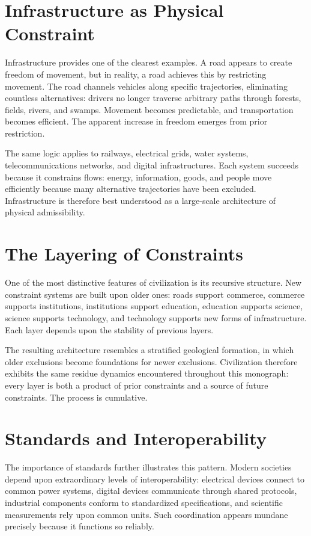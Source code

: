 \documentclass[11pt,oneside]{book}
\theoremstyle{plain}
\theoremstyle{definition}
\theoremstyle{remark}
\begin{document}
\section{Infrastructure as Physical Constraint}

Infrastructure provides one of the clearest examples. A road appears to create freedom of movement, but in reality, a road achieves this by restricting movement. The road channels vehicles along specific trajectories, eliminating countless alternatives: drivers no longer traverse arbitrary paths through forests, fields, rivers, and swamps. Movement becomes predictable, and transportation becomes efficient. The apparent increase in freedom emerges from prior restriction.

The same logic applies to railways, electrical grids, water systems, telecommunications networks, and digital infrastructures. Each system succeeds because it constrains flows: energy, information, goods, and people move efficiently because many alternative trajectories have been excluded. Infrastructure is therefore best understood as a large-scale architecture of physical admissibility.

\section{The Layering of Constraints}

One of the most distinctive features of civilization is its recursive structure. New constraint systems are built upon older ones: roads support commerce, commerce supports institutions, institutions support education, education supports science, science supports technology, and technology supports new forms of infrastructure. Each layer depends upon the stability of previous layers.

The resulting architecture resembles a stratified geological formation, in which older exclusions become foundations for newer exclusions. Civilization therefore exhibits the same residue dynamics encountered throughout this monograph: every layer is both a product of prior constraints and a source of future constraints. The process is cumulative.

\section{Standards and Interoperability}

The importance of standards further illustrates this pattern. Modern societies depend upon extraordinary levels of interoperability: electrical devices connect to common power systems, digital devices communicate through shared protocols, industrial components conform to standardized specifications, and scientific measurements rely upon common units. Such coordination appears mundane precisely because it functions so reliably.
\end{document}
